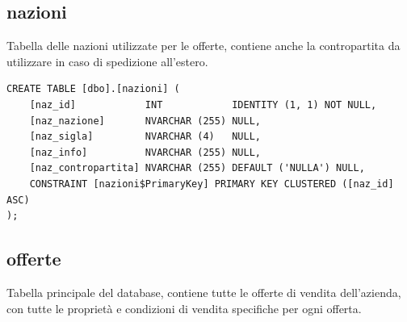\documentclass[12pt]{article}
\begin{document}
\subsection{nazioni}
Tabella delle nazioni utilizzate per le offerte, contiene anche la contropartita da utilizzare in caso di spedizione all'estero.
\begin{lstlisting}
CREATE TABLE [dbo].[nazioni] (
    [naz_id]            INT            IDENTITY (1, 1) NOT NULL,
    [naz_nazione]       NVARCHAR (255) NULL,
    [naz_sigla]         NVARCHAR (4)   NULL,
    [naz_info]          NVARCHAR (255) NULL,
    [naz_contropartita] NVARCHAR (255) DEFAULT ('NULLA') NULL,
    CONSTRAINT [nazioni$PrimaryKey] PRIMARY KEY CLUSTERED ([naz_id] ASC)
);
\end{lstlisting}

\subsection{offerte}
Tabella principale del database, contiene tutte le offerte di vendita dell'azienda, con tutte le proprietà e condizioni di vendita
specifiche per ogni offerta.
\end{document}
